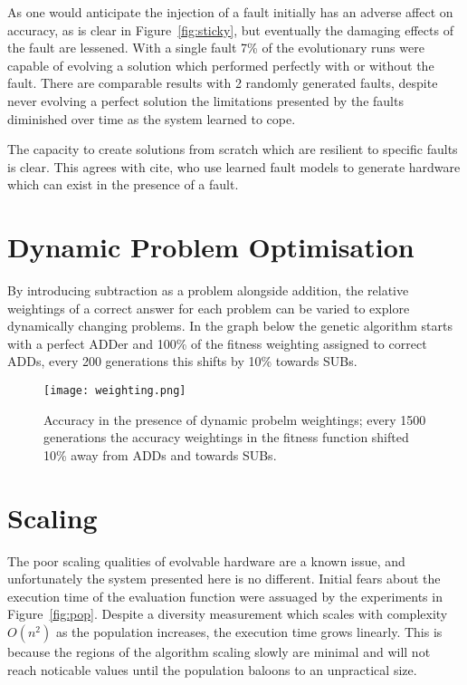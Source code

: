 As one would anticipate the injection of a fault initially has an adverse affect on
accuracy, as is clear in Figure~\ref{fig:sticky}, but eventually the damaging effects
of the fault are lessened. With a single fault 7\% of the evolutionary runs
were capable of evolving a solution which performed perfectly with or without
the fault. There are comparable results with 2 randomly generated faults, despite
never evolving a perfect solution the limitations presented by the faults diminished
over time as the system learned to cope.

The capacity to create solutions from scratch which are resilient to specific faults
is clear. This agrees with \todo cite, who use learned fault models to generate
hardware which can exist in the presence of a fault.

\section{Dynamic Problem Optimisation}
By introducing subtraction as a problem alongside addition, the relative weightings of a correct answer for each problem can be varied to explore dynamically changing problems. In the graph below the genetic algorithm starts with a perfect ADDer and 100\% of the fitness weighting assigned to correct ADDs, every 200 generations this shifts by 10\% towards SUBs.

\begin{figure}
	\centering
	\texttt{[image: weighting.png]}
	\caption[Accuracy in the presence of dynamic probelm weightings]
	{Accuracy in the presence of dynamic probelm weightings;
		every 1500 generations the accuracy weightings in the fitness
	function shifted 10\% away from ADDs and towards SUBs.}
\end{figure}

\section{Scaling \label{s:scaling}}

The poor scaling qualities of evolvable hardware are a known issue, and
unfortunately the system presented here is no different. Initial fears
about the execution time of the evaluation function were assuaged by
the experiments in Figure~\ref{fig:pop}. Despite a diversity measurement
which scales with complexity $O(n^2)$ as the population increases, the
execution time grows linearly. This is because the regions of the algorithm
scaling slowly are minimal and will not reach noticable values until the
population baloons to an unpractical size.


